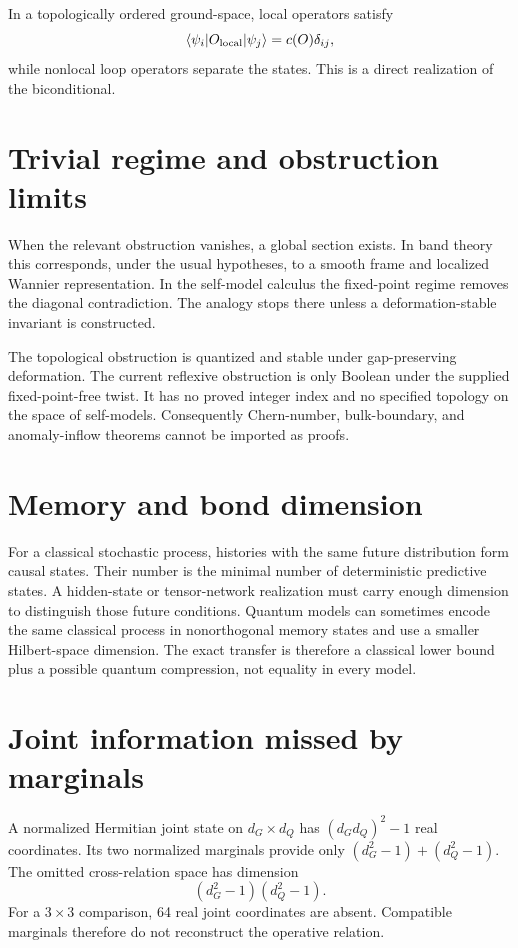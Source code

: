 \documentclass[11pt,a4paper]{article}
\begin{document}
In a topologically ordered ground-space, local operators satisfy
\begin{equation}
\langle\psi_i|O_{\rm local}|\psi_j\rangle=c(O)\delta_{ij},
\end{equation}
while nonlocal loop operators separate the states. This is a direct realization of the biconditional.

\section{Trivial regime and obstruction limits}
When the relevant obstruction vanishes, a global section exists. In band theory this corresponds, under the usual hypotheses, to a smooth frame and localized Wannier representation. In the self-model calculus the fixed-point regime removes the diagonal contradiction. The analogy stops there unless a deformation-stable invariant is constructed.

The topological obstruction is quantized and stable under gap-preserving deformation. The current reflexive obstruction is only Boolean under the supplied fixed-point-free twist. It has no proved integer index and no specified topology on the space of self-models. Consequently Chern-number, bulk-boundary, and anomaly-inflow theorems cannot be imported as proofs.

\section{Memory and bond dimension}
For a classical stochastic process, histories with the same future distribution form causal states. Their number is the minimal number of deterministic predictive states. A hidden-state or tensor-network realization must carry enough dimension to distinguish those future conditions. Quantum models can sometimes encode the same classical process in nonorthogonal memory states and use a smaller Hilbert-space dimension. The exact transfer is therefore a classical lower bound plus a possible quantum compression, not equality in every model.

\section{Joint information missed by marginals}
A normalized Hermitian joint state on $d_G\times d_Q$ has $(d_Gd_Q)^2-1$ real coordinates. Its two normalized marginals provide only $(d_G^2-1)+(d_Q^2-1)$. The omitted cross-relation space has dimension
\begin{equation}
(d_G^2-1)(d_Q^2-1).
\end{equation}
For a $3\times3$ comparison, 64 real joint coordinates are absent. Compatible marginals therefore do not reconstruct the operative relation.
\end{document}
